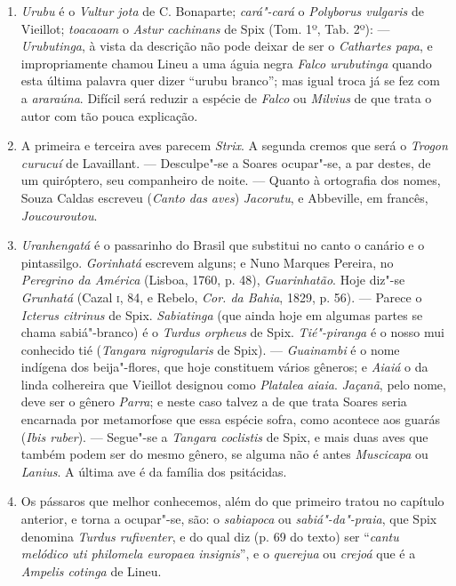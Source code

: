 \begin{enumerate}
\item  \textit{Urubu} é o \textit{Vultur jota} de C. Bonaparte; \textit{cará"-cará} o \textit{Polyborus vulgaris} de Vieillot; 
\textit{toacaoam} o \textit{Astur cachinans} de Spix (Tom. 1º, Tab. 2º):
--- \textit{Urubutinga}, à vista da descrição não pode deixar de ser o \textit{Cathartes papa},
e impropriamente chamou Lineu a uma águia negra \textit{Falco urubutinga}
quando esta última palavra quer dizer ``urubu branco'';  mas igual troca
já se fez com a \textit{araraúna}. Difícil será reduzir a espécie de \textit{Falco} ou \textit{Milvius}
de que trata o autor com tão pouca explicação.

\item A primeira e terceira aves parecem \textit{Strix}. A segunda cremos que será o 
\textit{Trogon curucuí} de Lavaillant. --- Desculpe"-se a Soares ocupar"-se, a par destes, de um 
quiróptero, seu companheiro de noite. --- Quanto à ortografia dos nomes, Souza Caldas 
escreveu (\textit{Canto das aves}) \textit{Jacorutu}, e Abbeville, em francês, \textit{Joucouroutou}.

\item \textit{Uranhengatá} é o passarinho do Brasil que substitui no canto o canário e o 
pintassilgo. \textit{Gorinhatá} escrevem alguns; e Nuno Marques Pereira, no \textit{Peregrino da América} 
(Lisboa, 1760, p. 48), \textit{Guarinhatão}. Hoje diz"-se \textit{Grunhatá} (Cazal \textsc{i}, 84, e 
Rebelo, \textit{Cor. da Bahia}, 1829, p. 56). --- Parece o \textit{Icterus citrinus} de Spix. \textit{Sabiatinga} 
(que ainda hoje em algumas partes se chama sabiá"-branco) é o \textit{Turdus orpheus} de Spix. 
\textit{Tié"-piranga} é o nosso mui conhecido tié  (\textit{Tangara nigrogularis} de Spix).
--- \textit{Guainambi} é o nome indígena dos beija"-flores, que hoje 
constituem vários gêneros; e \textit{Aiaiá} o da linda colhereira que Vieillot designou como 
\textit{Platalea aiaia}. \textit{Jaçanã}, pelo nome, deve ser o gênero \textit{Parra}; e neste caso talvez a de que trata Soares 
seria encarnada por metamorfose que essa espécie sofra, como acontece aos guarás (\textit{Ibis ruber}). --- 
Segue"-se a \textit{Tangara coclistis} de Spix, e mais duas aves que também podem ser do 
mesmo gênero, se alguma não é antes \textit{Muscicapa} ou \textit{Lanius}. A última ave é da família dos 
psitácidas.

\item Os pássaros que melhor conhecemos, além do que primeiro tratou no capítulo 
anterior, e torna a ocupar"-se, são: o \textit{sabiapoca} ou \textit{sabiá"-da"-praia}, que Spix denomina  
\textit{Turdus rufiventer}, e do qual diz (p. 69 do texto) ser ``\textit{cantu melódico uti philomela 
europaea insignis}'',  e o \textit{querejua} ou \textit{crejoá} que é a \textit{Ampelis cotinga} de Lineu.


\end{enumerate}
